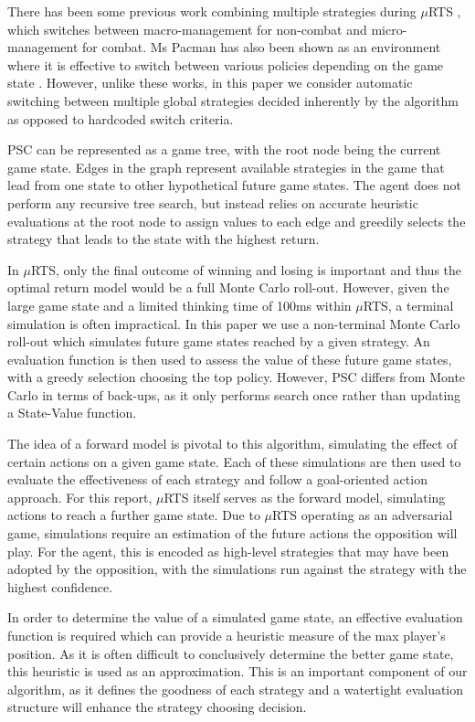 \documentclass[]{article}
\begin{document}
There has been some previous work combining multiple strategies during $\mu$RTS \cite{barriga2017combining}, which switches between macro-management for non-combat and micro-management for combat. Ms Pacman has also been shown as an environment where it is effective to switch between various policies depending on the game state \cite{pepels2014real}. However, unlike these works, in this paper we consider automatic switching between multiple global strategies decided inherently by the algorithm as opposed to hardcoded switch criteria.
 
PSC can be represented as a game tree, with the root node being the current game state. Edges in the graph represent available strategies in the game that lead from one state to other hypothetical future game states. The agent does not perform any recursive tree search, but instead relies on accurate heuristic evaluations at the root node to assign values to each edge and greedily selects the strategy that leads to the state with the highest return.

In $\mu$RTS, only the final outcome of winning and losing is important and thus the optimal return model would be a full Monte Carlo roll-out. However, given the large game state and a limited thinking time of 100ms within $\mu$RTS, a terminal simulation is often impractical. In this paper we use a non-terminal Monte Carlo roll-out which simulates future game states reached by a given strategy. An evaluation function is then used to assess the value of these future game states, with a greedy selection choosing the top policy. However, PSC differs from Monte Carlo in terms of back-ups, as it only performs search once rather than updating a State-Value function.

The idea of a forward model is pivotal to this algorithm, simulating the effect of certain actions on a given game state. Each of these simulations are then used to evaluate the effectiveness of each strategy and follow a goal-oriented action approach. For this report, $\mu$RTS itself serves as the forward model, simulating actions to reach a further game state.  Due to $\mu$RTS operating as an adversarial game, simulations require an estimation of the future actions the opposition will play. For the agent, this is encoded as high-level strategies that may have been adopted by the opposition, with the simulations run against the strategy with the highest confidence.

In order to determine the value of a simulated game state, an effective evaluation function is required which can provide a heuristic measure of the max player’s position. As it is often difficult to conclusively determine the better game state, this heuristic is used as an approximation. This is an important component of our algorithm, as it defines the goodness of each strategy and a watertight evaluation structure will enhance the strategy choosing decision.
\end{document}
